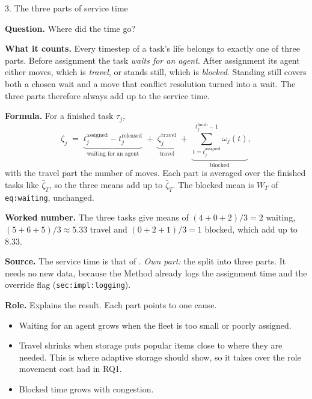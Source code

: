 \documentclass[11pt,a4paper]{article}
\newcommand{\row}[1]{\par\smallskip\noindent\textbf{#1}\enspace}
\begin{document}
\begin{card}{3. The three parts of service time}
\row{Question.} Where did the time go?

\row{What it counts.} Every timestep of a task's life belongs to exactly
one of three parts. Before assignment the task \emph{waits for an agent}.
After assignment its agent either moves, which is \emph{travel}, or stands
still, which is \emph{blocked}. Standing still covers both a chosen wait
and a move that conflict resolution turned into a wait. The three parts
therefore always add up to the service time.

\row{Formula.} For a finished task $\tau_j$,
\[
  \zeta_j \;=\;
  \underbrace{t_j^{\mathrm{assigned}} - t_j^{\mathrm{released}}}_{\text{waiting for an agent}}
  \;+\; \underbrace{\zeta_j^{\mathrm{travel}}}_{\text{travel}}
  \;+\; \underbrace{\textstyle\sum_{t=t_j^{\mathrm{assigned}}}^{t_j^{\mathrm{finish}}-1}\omega_j(t)}_{\text{blocked}} ,
\]
with the travel part the number of moves. Each part is averaged over the
finished tasks like $\bar\zeta_T$, so the three means add up to
$\bar\zeta_T$. The blocked mean is $W_T$ of \texttt{eq:waiting}, unchanged.

\row{Worked number.} The three tasks give means of $(4+0+2)/3 = 2$
waiting, $(5+6+5)/3 \approx 5.33$ travel and $(0+2+1)/3 = 1$ blocked, which
add up to $8.33$.

\row{Source.} The service time is that of \citet{ma2017lifelong_mapf}.
\emph{Own part:} the split into three parts. It needs no new data, because
the Method already logs the assignment time and the override flag
(\texttt{sec:impl:logging}).

\row{Role.} Explains the result. Each part points to one cause.
\begin{itemize}[nosep]
  \item Waiting for an agent grows when the fleet is too small or poorly
    assigned.
  \item Travel shrinks when storage puts popular items close to where they
    are needed. This is where adaptive storage should show, so it takes
    over the role movement cost had in RQ1.
  \item Blocked time grows with congestion.
\end{itemize}
\end{card}
\end{document}
